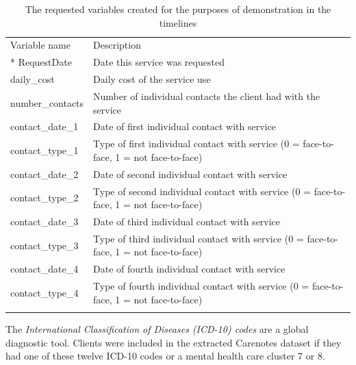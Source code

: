 \documentclass{article}
\begin{document}
\begin{table}[h]
	\centering
	\caption{The requested variables created for the purposes of demonstration in the timelines}
	\begin{tabular}{
			p{}%
			p{}%
		}
		\toprule
		Variable name & Description
		\tabularnewline*
		\midrule
		RequestDate & Date this service was requested \\
		daily\_cost & Daily cost of the service use \\
		number\_contacts &  Number of individual contacts the client had with the service \\
		contact\_date\_1 & Date of first individual contact with service \\
		contact\_type\_1 &  Type of first individual contact with service (0 = face-to-face, 1 = not face-to-face) \\
		contact\_date\_2 &  Date of second individual contact with service \\
		contact\_type\_2 & Type of second individual contact with service (0 = face-to-face, 1 = not face-to-face) \\
		contact\_date\_3 & Date of third individual contact with service \\
		contact\_type\_3 & Type of third individual contact with service (0 = face-to-face, 1 = not face-to-face) \\
		contact\_date\_4 & Date of fourth individual contact with service \\
		contact\_type\_4 & Type of fourth individual contact with service (0 = face-to-face, 1 = not face-to-face) \\
		\bottomrule
		\label{tab:carenotes_variables}
	\end{tabular}
\end{table}

\newpage
The \textit{International Classification of Diseases (ICD-10) codes} are a global diagnostic tool.
Clients were included in the extracted Carenotes dataset if they had one of these twelve ICD-10 codes or a mental health care cluster 7 or 8.
\end{document}
